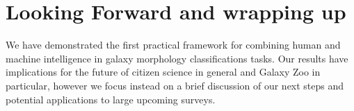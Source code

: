 \documentclass[twocolumn]{aastex6}
\newcommand{\feat}{`Featured'}
\newcommand{\notfeat}{`Not'}
\begin{document}




\section{Looking Forward and wrapping up}\label{sec: visions}

We have demonstrated the first practical framework for combining human and machine
 intelligence in galaxy morphology classifications tasks. 
Our results have implications for the future of citizen science in general and 
Galaxy Zoo in particular, however we focus instead on a brief discussion of our next 
steps and potential applications to large upcoming surveys. 
\end{document}
